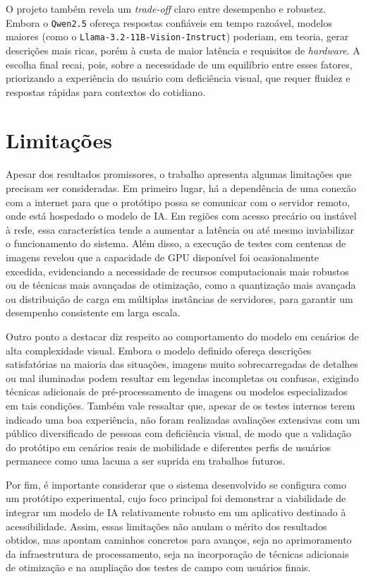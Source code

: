 O projeto também revela um \textit{trade-off} claro entre desempenho e robustez. Embora o \texttt{Qwen2.5} ofereça respostas confiáveis em tempo razoável, modelos maiores (como o \texttt{Llama-3.2-11B-Vision-Instruct}) poderiam, em teoria, gerar descrições mais ricas, porém à custa de maior latência e requisitos de \textit{hardware}. A escolha final recai, pois, sobre a necessidade de um equilíbrio entre esses fatores, priorizando a experiência do usuário com deficiência visual, que requer fluidez e respostas rápidas para contextos do cotidiano.

\section{Limitações}

Apesar dos resultados promissores, o trabalho apresenta algumas limitações que precisam ser consideradas. Em primeiro lugar, há a dependência de uma conexão com a internet para que o protótipo possa se comunicar com o servidor remoto, onde está hospedado o modelo de IA. Em regiões com acesso precário ou instável à rede, essa característica tende a aumentar a latência ou até mesmo inviabilizar o funcionamento do sistema. Além disso, a execução de testes com centenas de imagens revelou que a capacidade de GPU disponível foi ocasionalmente excedida, evidenciando a necessidade de recursos computacionais mais robustos ou de técnicas mais avançadas de otimização, como a quantização mais avançada ou distribuição de carga em múltiplas instâncias de servidores, para garantir um desempenho consistente em larga escala.

Outro ponto a destacar diz respeito ao comportamento do modelo em cenários de alta complexidade visual. Embora o modelo definido ofereça descrições satisfatórias na maioria das situações, imagens muito sobrecarregadas de detalhes ou mal iluminadas podem resultar em legendas incompletas ou confusas, exigindo técnicas adicionais de pré-processamento de imagens ou modelos especializados em tais condições. Também vale ressaltar que, apesar de os testes internos terem indicado uma boa experiência, não foram realizadas avaliações extensivas com um público diversificado de pessoas com deficiência visual, de modo que a validação do protótipo em cenários reais de mobilidade e diferentes perfis de usuários permanece como uma lacuna a ser suprida em trabalhos futuros.

Por fim, é importante considerar que o sistema desenvolvido se configura como um protótipo experimental, cujo foco principal foi demonstrar a viabilidade de integrar um modelo de IA relativamente robusto em um aplicativo destinado à acessibilidade. Assim, essas limitações não anulam o mérito dos resultados obtidos, mas apontam caminhos concretos para avanços, seja no aprimoramento da infraestrutura de processamento, seja na incorporação de técnicas adicionais de otimização e na ampliação dos testes de campo com usuários finais.

